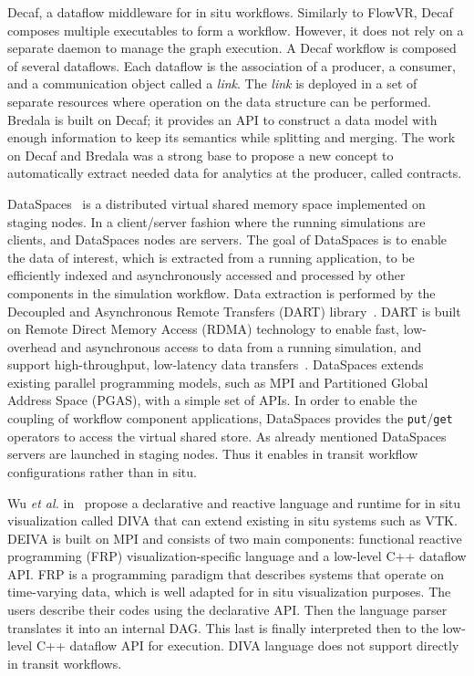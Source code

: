 Decaf\cite{dreher_decaf_2017}, a dataflow middleware for in situ workflows. Similarly to FlowVR, Decaf composes multiple executables to form a workflow. However, it does not rely on a separate daemon to manage the graph execution. A Decaf workflow is composed of several dataflows. Each dataflow is the association of a producer, a consumer, and a communication object called a \textit{link}.  The \textit{link} is deployed in a set of separate resources where operation on the data structure can be performed. Bredala\cite{dreher_bredala_2016} is built on Decaf; it provides an API to construct a data model with enough information to keep its semantics while splitting and merging. The work on Decaf and Bredala was a strong base to propose a new concept to automatically extract needed data for analytics at the producer, called contracts\cite{mommessin_automatic_2017}.


DataSpaces~\cite{docan_dataspaces_2012} is a distributed virtual shared memory space implemented on staging nodes. 
In a client/server fashion where the running simulations are clients, and DataSpaces nodes are servers.  
The goal of DataSpaces is to enable the data of interest, which is extracted from a running application, to be efficiently indexed and asynchronously accessed and processed by other components in the simulation workflow. 
Data extraction is performed by the Decoupled and Asynchronous Remote Transfers (DART) library~\cite{DART_2008, docan2010enabling_dart}. 
DART is built on Remote Direct Memory Access (RDMA) technology to enable fast, low-overhead and asynchronous access to data from a running simulation, and support high-throughput, low-latency data transfers~\cite{bennett_combining_2012_dataspaces}. 
DataSpaces extends existing parallel programming models, such as MPI and Partitioned Global Address Space (PGAS), with a simple set of APIs. In order to enable the coupling of workflow component applications, DataSpaces provides the \texttt{put}/\texttt{get} operators to access the virtual shared store. As already mentioned DataSpaces servers are launched in staging nodes. Thus it enables in transit workflow configurations rather than in situ.

Wu \textit{et al.} in~\cite{wu_diva_2020} propose a declarative and reactive language and runtime for in situ visualization called DIVA that can extend existing in situ systems such as VTK. DEIVA is built on MPI and consists of two main components: functional reactive programming (FRP) visualization-specific language and a low-level C++ dataflow API. FRP\cite{ wan2000functional_FRP, blackheath2016functional_FRP, perez2016functional_FRP} is a programming paradigm that describes systems that operate on time-varying data, which is well adapted for in situ visualization purposes. The users describe their codes using the declarative API. Then the language parser translates it into an internal DAG. This last is finally interpreted then to the low-level C++ dataflow API for execution. DIVA language does not support directly in transit workflows.
 
